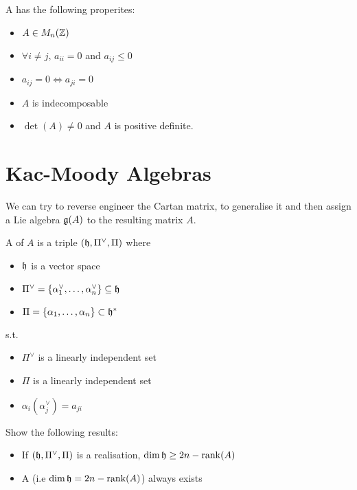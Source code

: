 \documentclass{article}
\begin{document}
\begin{prop}
A has the following properites: 
\begin{itemize}
    \item $A \in M_n(\mathbb{Z})$ 
    \item $\forall i \neq j, \, a_{ii}=0 $ and $a_{ij}\leq 0$ 
    \item $a_{ij}=0 \Leftrightarrow a_{ji}=0$ 
    \item $A$ is indecomposable
    \item $\det(A) \neq 0$ and $A$ is positive definite. 
\end{itemize}
\end{prop}

\section{Kac-Moody Algebras}

\begin{idea}
We can try to reverse engineer the Cartan matrix, to generalise it and then assign a Lie algebra $\mathfrak{g}(A)$ to the resulting matrix $A$. 
\end{idea}

\begin{definition}
A  of $A$ is a triple $(\mathfrak{h},\Pi^\vee,\Pi)$ where
\begin{itemize}
    \item $\mathfrak{h}$ is a vector space 
    \item $\Pi^\vee = \left\{ \alpha_1^\vee, \dots, \alpha^\vee_n \right\} \subseteq \mathfrak{h}$ 
    \item $\Pi = \left\{ \alpha_1, \dots, \alpha_n \right\} \subset \mathfrak{h}^\ast$
\end{itemize}
s.t. 
\begin{itemize}
    \item $\Pi^\vee$ is a linearly independent set 
    \item $\Pi$ is a linearly independent set 
    \item $\alpha_i(\alpha_j^\vee) = a_{ji}$
\end{itemize}
\end{definition}

\begin{ex}
Show the following results: 
\begin{itemize}
    \item If $(\mathfrak{h},\Pi^\vee,\Pi)$ is a realisation, $\dim \mathfrak{h} \geq 2n-\operatorname{rank}(A)$
    \item A  (i.e $\dim \mathfrak{h} = 2n-\operatorname{rank}(A)$) always exists
\end{itemize}
\end{ex}
\end{document}
